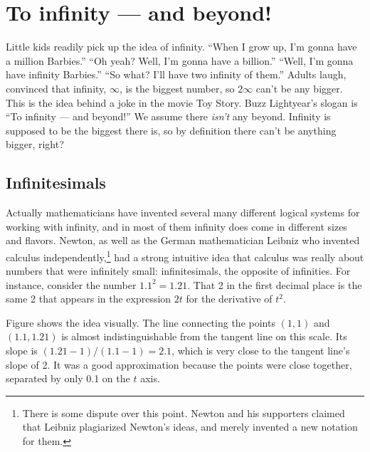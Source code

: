\chapter{To infinity --- and beyond!}

Little kids readily pick up the idea of infinity.
``When I grow up, I'm
gonna have a million Barbies.'' ``Oh yeah? Well, I'm gonna have a billion.''
``Well, I'm gonna have infinity Barbies.'' ``So what? I'll have two infinity of them.''
Adults laugh, convinced that infinity, $\infty$, is the biggest number, so $2\infty$
can't be any bigger. This is the idea behind a joke in the movie Toy Story. Buzz
Lightyear's slogan is ``To infinity --- and beyond!'' We assume there \emph{isn't}
any beyond. Infinity is supposed to be the biggest there is, so by definition there
can't be anything bigger, right?

\section{Infinitesimals}

%
Actually mathematicians have invented several many different logical systems for working
with infinity, and in most of them infinity does come in different sizes and flavors.
Newton, as well as the German mathematician Leibniz
who invented calculus independently,\footnote{There is
some dispute over this point. Newton and his supporters claimed that Leibniz plagiarized Newton's
ideas, and merely invented a new notation for them.}
had a strong intuitive idea that calculus was really about numbers that were infinitely
small: infinitesimals, the opposite of infinities. For instance, consider
the number $1.1^2=1.21$. That 2 in the first decimal place is the same 2 that
appears in the expression $2t$ for the derivative of $t^2$.


Figure   shows the idea visually. The line connecting the points $(1,1)$ and $(1.1,1.21)$ is almost
indistinguishable from the tangent line on this scale. Its slope is $(1.21-1)/(1.1-1)=2.1$, which is very close to the
tangent line's slope of 2. It was a good approximation because the points were close together, separated by only
0.1 on the $t$ axis.

